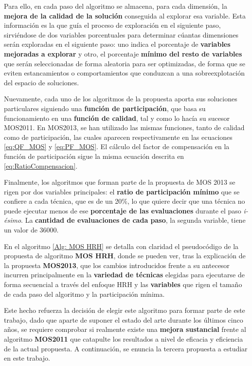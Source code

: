Para ello, en cada paso del algoritmo se almacena, para cada dimensión, la \textbf{mejora de la calidad de la solución} conseguida al explorar esa variable. Esta información es la que guía el proceso de exploración en el siguiente paso, sirviéndose de dos variables porcentuales para determinar cúantas dimensiones serán exploradas en el siguiente paso: uno indica el porcentaje de \textbf{variables mejoradas a explorar} y otro, el porcentaje \textbf{mínimo del resto de variables} que serán seleccionadas de forma aleatoria para ser optimizadas, de forma que se eviten estancamientos o comportamientos que conduzcan a una sobreexplotación del espacio de soluciones.

Nuevamente, cada uno de los algoritmos de la propuesta aporta sus soluciones particulares siguiendo una \textbf{función de participación}, que basa su funcionamiento en una \textbf{función de calidad}, tal y como lo hacía su sucesor MOS2011. En MOS2013, se han utilizado las mismas funciones, tanto de calidad como de participación, las cuales aparecen respectivamente en las ecuaciones \ref{eq:QF_MOS} y \ref{eq:PF_MOS}. El cálculo del factor de compensación en la función de participación sigue la misma ecuación descrita en \ref{eq:RatioCompensacion}.

Finalmente, los algoritmos que forman parte de la propuesta de MOS 2013 se rigen por dos variables principales: el \textbf{ratio de participación mínimo} que se confiere a cada técnica, que es de un 20\%, lo que quiere decir que una técnica no puede ejecutar menos de ese \textbf{porcentaje de las evaluaciones} durante el paso \textit{i-ésimo}. La \textbf{cantidad de evaluaciones de cada paso}, la segunda variable, tiene un valor de 36000. 

En el algoritmo \ref{Alg: MOS HRH} se detalla con claridad el pseudocódigo de la propuesta de algoritmo \textbf{MOS HRH}, donde se pueden ver, tras la explicación de la propuesta \textbf{MOS2013}, que los cambios introducidos frente a su antecesor incurren principalmente en la \textbf{variedad de técnicas} elegidas para ejecutarse de forma secuencial a través del enfoque HRH y las \textbf{variables} que rigen el tamaño de cada paso del algoritmo y la participación mínima.

Este hecho refuerza la decisión de elegir este algoritmo para formar parte de este trabajo, dado que aparte de suponer el estado del arte durante los últimos cinco años, se requiere comprobar si realmente existe una \textbf{mejora sustancial} frente al algoritmo \textbf{MOS2011} que catapulte los resultados a nivel de eficacia y eficiencia de la actual propuesta. A continuación, se enuncia la tercera propuesta a estudiar en este trabajo.


